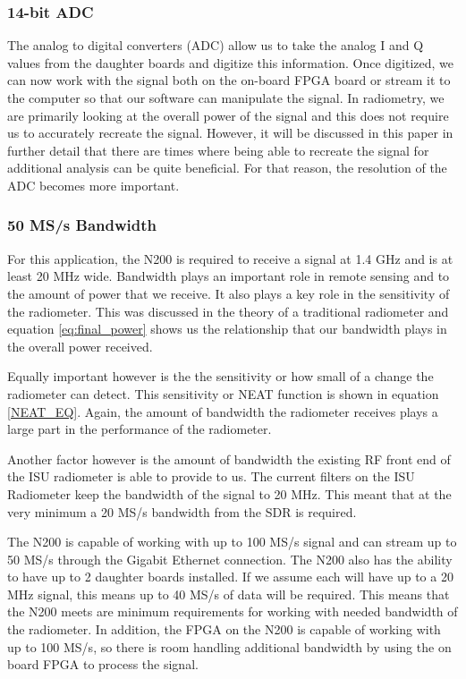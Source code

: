 \subsubsection{14-bit ADC}
The analog to digital converters (ADC) allow us to take the analog I and Q values from the daughter boards and digitize this information.  Once digitized, we can now work with the signal both on the on-board FPGA board or stream it to the computer so that our software can manipulate the signal.  In radiometry, we are primarily looking at the overall power of the signal and this does not require us to accurately recreate the signal.  However, it will be discussed in this paper in further detail that there are times where being able to recreate the signal for additional analysis can be quite beneficial.  For that reason, the resolution of the ADC becomes more important.

\subsubsection{50 MS/s Bandwidth}
For this application, the N200 is required to receive a signal at 1.4 GHz and is at least 20 MHz wide.  Bandwidth plays an important role in remote sensing and to the amount of power that we receive.  It also plays a key role in the sensitivity of the radiometer.  This was discussed in the theory of a traditional radiometer and equation \ref{eq:final_power} shows us the relationship that our bandwidth plays in the overall power received.    

Equally important however is the the sensitivity or how small of a change the radiometer can detect.  This sensitivity or NEAT function is shown in equation \ref{NEAT_EQ}.  Again, the amount of bandwidth the radiometer receives plays a large part in the performance of the radiometer.  

Another factor however is the amount of bandwidth the existing RF front end of the ISU radiometer is able to provide to us.  The current filters on the ISU Radiometer keep the bandwidth of the signal to 20 MHz.  This meant that at the very minimum a 20 MS/s bandwidth from the SDR is required.  

The N200 is capable of working with up to 100 MS/s signal and can stream up to 50 MS/s through the Gigabit Ethernet connection.  The N200 also has the ability to have up to 2 daughter boards installed.  If we assume each will have up to a 20 MHz signal, this means up to 40 MS/s of data will be required.  This means that the N200 meets are minimum requirements for working with needed bandwidth of the radiometer.  In addition, the FPGA on the N200 is capable of working with up to 100 MS/s, so there is room handling additional bandwidth by using the on board FPGA to process the signal.

